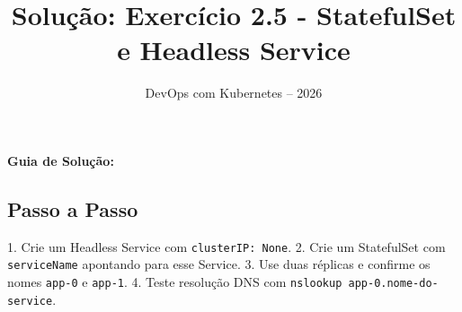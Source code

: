 \documentclass[11pt,a4paper]{article}
\title{\color{secondary}\Huge\textbf{Solução: Exercício 2.5 - StatefulSet e Headless Service}}
\author{\color{primary}DevOps com Kubernetes -- 2026}
\date{}
\begin{document}
\maketitle


\textbf{Guia de Solução:}

\subsection*{\color{secondary}Passo a Passo}

1. Crie um Headless Service com \texttt{clusterIP: None}.
2. Crie um StatefulSet com \texttt{serviceName} apontando para esse Service.
3. Use duas réplicas e confirme os nomes \texttt{app-0} e \texttt{app-1}.
4. Teste resolução DNS com \texttt{nslookup app-0.nome-do-service}.
\end{document}
